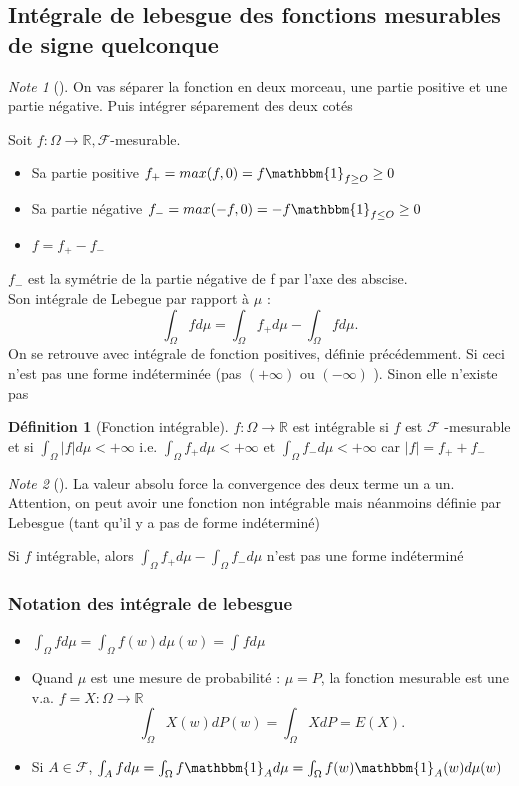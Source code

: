 \documentclass{article}
\theoremstyle{plain}%
\theoremstyle{definition}
\newtheorem{defn}{Définition}[section]
\theoremstyle{remark}
\newtheorem*{note}{Note}
\begin{document}
\subsection{Intégrale de lebesgue des fonctions mesurables de signe quelconque}
\begin{note}[]
    On vas séparer la fonction en deux morceau, une partie positive et une partie négative. Puis intégrer séparement des deux cotés
\end{note}
Soit $ f: \Omega \to \mathbb{R}, \mathcal{F} $-mesurable.\begin{itemize}
    \item Sa partie positive $ f_+ = max(f,0) = f \mathbbm{1}_{f \geq O} \geq 0 $ 
    \item Sa partie négative $ f_- = max(-f,0) = -f \mathbbm{1}_{f \leq O} \geq 0 $ 
    \item $ f = f_+ - f_- $ 
\end{itemize}
$ f_- $ est la symétrie de la partie négative de f par l'axe des abscise. \\
Son intégrale de Lebegue par rapport à $ \mu  $ : 
\[
    \int_{\Omega }^{}fd \mu = \int_{\Omega }^{}f_+ d \mu - \int_{\Omega }^{}fd \mu 
.\]
On se retrouve avec intégrale de fonction positives, définie précédemment. Si ceci n'est pas une forme indéterminée (pas $ (+\infty ) $ ou $ (-\infty ) $ ). Sinon elle n'existe pas 
\begin{defn}[Fonction intégrable]
    $ f: \Omega \to \mathbb{R} $ est intégrable si $ f $ est $ \mathcal{F} $ -mesurable et si $ \int_{\Omega }^{}\left| f \right| d \mu < +\infty  $ i.e. $ \int_{\Omega }^{}f_+ d \mu < +\infty \text{ et } \int_{\Omega }^{}f_- d \mu < +\infty $ car $ \left| f \right| = f_+ + f_- $ 
    \begin{note}[]
        La valeur absolu force la convergence des deux terme un a un. Attention, on peut avoir une fonction non intégrable mais néanmoins définie par Lebesgue (tant qu'il y a pas de forme indéterminé)
    \end{note}    
    Si $ f $ intégrable, alors $ \int_{\Omega }^{}f_+ d \mu  - \int_{\Omega }^{}f_- d \mu  $ n'est pas une forme indéterminé
\end{defn}
\subsubsection{Notation des intégrale de lebesgue}
\begin{itemize}
    \item $ \int_{\Omega }^{}f d \mu = \int_{\Omega }^{}f(w)d \mu (w) = \int_{}^{}f d \mu  $ 
    \item Quand $ \mu  $ est une mesure de probabilité : $ \mu = P $, la fonction mesurable est une v.a. $ f=X: \Omega \to \mathbb{R} $ 
    \[
        \int_{\Omega }^{}X(w) d P(w) = \int_{\Omega }^{}XdP = E(X)
    .\]
    \item Si $ A \in \mathcal{F} $, $\int_{A}^{}fd \mu = \int_{\Omega }^{}f \mathbbm{1}_{A} d \mu = \int_{\Omega }^{}f(w) \mathbbm{1}_{A}(w)d \mu (w)$
\end{itemize}
\end{document}
